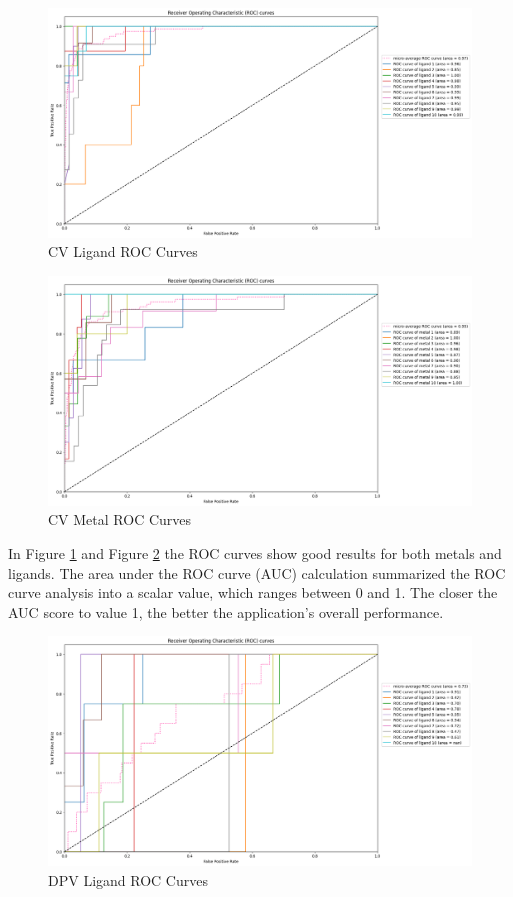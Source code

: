 \begin{figure}[h!]
  \centering
    \includegraphics[width=1.0\textwidth]{figures/ligand_roc.png}
    \caption{CV Ligand ROC Curves}
    \label{ligand_roc}
\end{figure}
\begin{figure}[h!]
  \centering
    \includegraphics[width=1.0\textwidth]{figures/metal_roc.png}
    \caption{CV Metal ROC Curves}
    \label{metal_roc}
\end{figure}
In Figure \ref{ligand_roc} and Figure \ref{metal_roc} the ROC curves show good results for both metals and ligands. The area under the ROC curve (AUC) calculation summarized the ROC curve analysis into a scalar value, which ranges between 0 and 1. The closer the AUC score to value 1, the better the application’s overall performance.
\begin{figure}[h!]
  \centering
    \includegraphics[width=1.0\textwidth]{figures/dpv_ligand_roc.png}
    \caption{DPV Ligand ROC Curves}
    \label{dpv_ligand_roc}
\end{figure}
